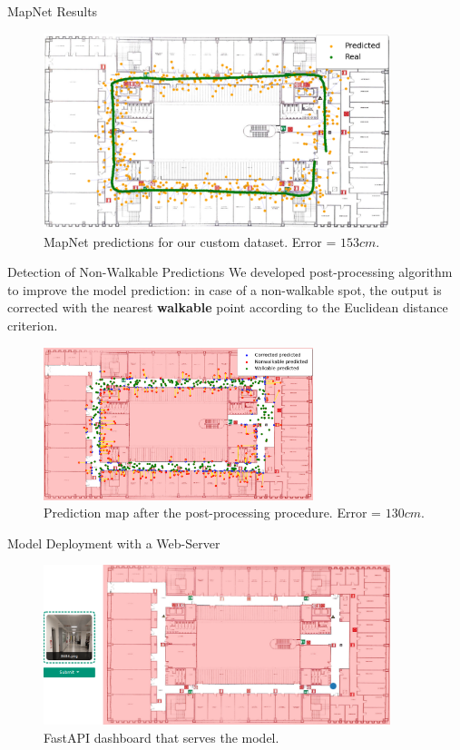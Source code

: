 \documentclass[
    center,
]{beamer}
\begin{document}
\begin{frame}{MapNet Results}
    \begin{figure}
        \centering
        \includegraphics[width=0.9\textwidth]{../imgs/mapnet_map.png}
        \caption{MapNet predictions for our custom dataset. Error = $153cm$.}
    \end{figure}
\end{frame}
\begin{frame}{Detection of Non-Walkable Predictions}
    We developed post-processing algorithm to improve the model prediction: in case of a non-walkable spot, the output is corrected with the nearest \textbf{walkable} point according to the Euclidean distance criterion.
    \begin{figure}
        \centering
        \includegraphics[width=0.7\textwidth]{../imgs/walkable_postprocess.png}
        \caption{Prediction map after the post-processing procedure. Error = $130cm$.}
    \end{figure}
\end{frame}
\begin{frame}{Model Deployment with a Web-Server}
    \begin{figure}
        \centering
        \includegraphics[width=0.9\textwidth]{../imgs/dashboard.png}
        \caption{FastAPI dashboard that serves the model.}
    \end{figure}
\end{frame}
\end{document}
